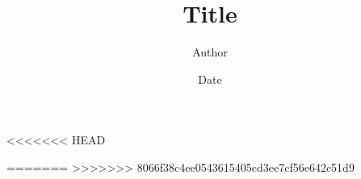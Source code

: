 \documentclass[11pt, a4paper, norsk]{article}
\title{Title}
\author{Author}
\date{Date}
\begin{document}
\maketitle

<<<<<<< HEAD

=======
\vfill
>>>>>>> 8066f38c4ee0543615405cd3ee7cf56e642c51d9
\thispagestyle{empty}
\newpage
\tableofcontents
\newpage



\newpage
{}
{}
\label{sec:bibliography}
\end{document}
